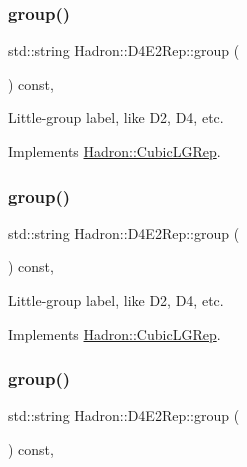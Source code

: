 \subsubsection{\texorpdfstring{group()}{group()}\hspace{0.1cm}{\footnotesize\ttfamily [3/5]}}
{\footnotesize\ttfamily std\+::string Hadron\+::\+D4\+E2\+Rep\+::group (\begin{DoxyParamCaption}{ }\end{DoxyParamCaption}) const\hspace{0.3cm}{\ttfamily [inline]}, {\ttfamily [virtual]}}

Little-\/group label, like D2, D4, etc. 

Implements \mbox{\hyperlink{structHadron_1_1CubicLGRep_a9bdb14b519a611d21379ed96a3a9eb41}{Hadron\+::\+Cubic\+L\+G\+Rep}}.

\mbox{\label{structHadron_1_1D4E2Rep_a7e858bda6dc247afd5e372ddbc3fcfe5}} 
\subsubsection{\texorpdfstring{group()}{group()}\hspace{0.1cm}{\footnotesize\ttfamily [4/5]}}
{\footnotesize\ttfamily std\+::string Hadron\+::\+D4\+E2\+Rep\+::group (\begin{DoxyParamCaption}{ }\end{DoxyParamCaption}) const\hspace{0.3cm}{\ttfamily [inline]}, {\ttfamily [virtual]}}

Little-\/group label, like D2, D4, etc. 

Implements \mbox{\hyperlink{structHadron_1_1CubicLGRep_a9bdb14b519a611d21379ed96a3a9eb41}{Hadron\+::\+Cubic\+L\+G\+Rep}}.

\mbox{\label{structHadron_1_1D4E2Rep_a7e858bda6dc247afd5e372ddbc3fcfe5}} 
\subsubsection{\texorpdfstring{group()}{group()}\hspace{0.1cm}{\footnotesize\ttfamily [5/5]}}
{\footnotesize\ttfamily std\+::string Hadron\+::\+D4\+E2\+Rep\+::group (\begin{DoxyParamCaption}{ }\end{DoxyParamCaption}) const\hspace{0.3cm}{\ttfamily [inline]}, {\ttfamily [virtual]}}

